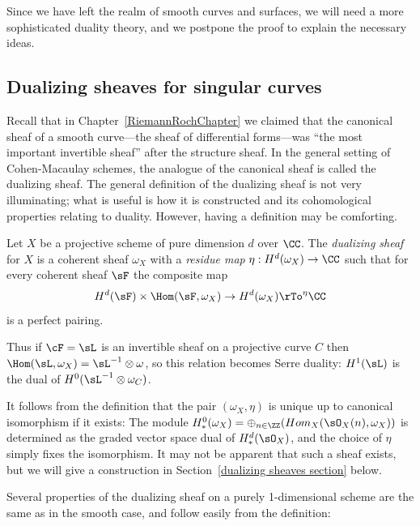 Since we have left the realm of smooth curves and surfaces, we will need a more sophisticated duality theory, and we
postpone the proof to explain the necessary ideas.



\subsection{Dualizing sheaves for singular curves}\label{duality}

Recall that in Chapter~\ref{RiemannRochChapter} we claimed that the canonical sheaf of a smooth curve---the sheaf of differential forms---was ``the most important invertible sheaf'' after the structure sheaf. In the general setting of Cohen-Macaulay schemes, the analogue of the canonical sheaf is called the dualizing sheaf.
The general definition of the dualizing sheaf is not very illuminating; what is useful is how it is constructed and its cohomological properties relating to duality.
However, having a definition may be comforting. 

\begin{definition}
Let $X$ be a projective scheme  of pure dimension $d$ over $\CC$. The \emph{dualizing sheaf} for $X$ is a coherent sheaf $\omega_X$ 
with a \emph{residue map} $\eta: H^d(\omega_X) \to \CC$ such that for every coherent sheaf  $\sF$ the composite map
$$
H^d(\sF) \times \Hom(\sF, \omega_X) \to H^d(\omega_X) \rTo^\eta \CC
$$
is a perfect pairing. 
\end{definition}

Thus if $\cF = \sL$ is an invertible sheaf on a projective curve $C$ then $\Hom(\sL, \omega_X) = \sL^{-1}\otimes \omega$,
so this relation becomes Serre duality: $H^{1}(\sL)$ is the dual of $H^{0}(\sL^{-1}\otimes \omega_{C})$.

It follows from the definition that the pair $(\omega_{X}, \eta)$ is unique up to canonical isomorphism if it exists:
The module $H^{0}_{*}(\omega_{X}) = \oplus_{n\in \ZZ}(Hom_{X}(\sO_{X}(n), \omega_{X}))$
is determined as the graded vector space dual of $H^{d}_{*}(\sO_{X})$, and the choice of $\eta$ simply fixes the isomorphism. It may not be apparent that such a sheaf exists, but we will give a construction in Section~\ref{dualizing sheaves section} below.
 
 Several properties of the dualizing sheaf on a purely 1-dimensional scheme
are the same as in the smooth case, and follow easily from the definition:

